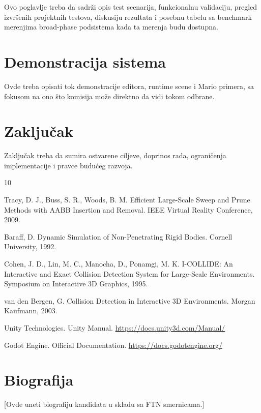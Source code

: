 \documentclass[12pt,a4paper]{report}
\begin{document}
Ovo poglavlje treba da sadrži opis test scenarija, funkcionalnu validaciju, pregled izvršenih projektnih testova, diskusiju rezultata i posebnu tabelu sa benchmark merenjima broad-phase podsistema kada ta merenja budu dostupna.

\chapter{Demonstracija sistema}

Ovde treba opisati tok demonstracije editora, runtime scene i Mario primera, sa fokusom na ono što komisija može direktno da vidi tokom odbrane.

\chapter{Zaključak}

Zaključak treba da sumira ostvarene ciljeve, doprinos rada, ograničenja implementacije i pravce budućeg razvoja.

\begin{thebibliography}{10}

Tracy, D. J., Buss, S. R., Woods, B. M.
Efficient Large-Scale Sweep and Prune Methods with AABB Insertion and Removal.
IEEE Virtual Reality Conference, 2009.

Baraff, D.
Dynamic Simulation of Non-Penetrating Rigid Bodies.
Cornell University, 1992.

Cohen, J. D., Lin, M. C., Manocha, D., Ponamgi, M. K.
I-COLLIDE: An Interactive and Exact Collision Detection System for Large-Scale Environments.
Symposium on Interactive 3D Graphics, 1995.

van den Bergen, G.
Collision Detection in Interactive 3D Environments.
Morgan Kaufmann, 2003.

Unity Technologies.
Unity Manual.
\url{https://docs.unity3d.com/Manual/}

Godot Engine.
Official Documentation.
\url{https://docs.godotengine.org/}

\end{thebibliography}

\chapter*{Biografija}

[Ovde uneti biografiju kandidata u skladu sa FTN smernicama.]
\end{document}
